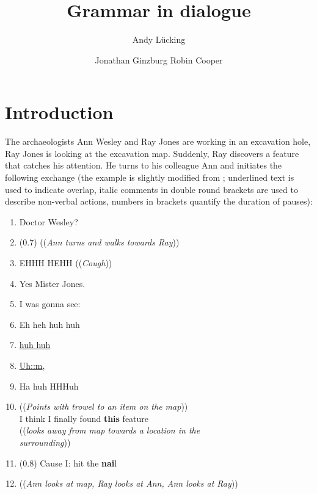 \documentclass[output=paper]{langsci/langscibook}
\author{%
	Andy Lücking\affiliation{Université de Paris, Goethe-Universität Frankfurt}%
	\and Jonathan Ginzburg\affiliation{Université de Paris}%
	\lastand Robin Cooper\affiliation{G\"{o}teborgs Universitet}%
}
\title{Grammar in dialogue}
\begin{document}
\label{chap-pragmatics}

\maketitle

{%
\avmoptions{}

\section{Introduction} 
\label{sec:introduction}

The archaeologists Ann Wesley and Ray Jones are working in an excavation hole, Ray Jones is looking at the excavation map.
%
Suddenly, Ray discovers a feature that catches his attention. %
He turns to his colleague Ann and initiates the following exchange (the example is slightly modified from \citet[]{Goodwin:2003}; underlined text is used to indicate overlap, italic comments in double round brackets are used to describe non-verbal actions, numbers in brackets quantify the duration of pauses):
%
\ea \label{ex:ann-ray}
\begin{enumerate}[noitemsep]
    \item {} Doctor Wesley?
    \item \speaking{} \quad (0.7) ((\textit{Ann turns and walks towards Ray}))
    \item {} EHHH HEHH ((\textit{Cough}))
    \item \speaking{} Yes Mister Jones.
    \item {} I was gonna see:
    \item {} \textdegree Eh heh huh huh
    \item \speaking{}  \underline{huh huh}
    \item {}  \underline{Uh::m},
    \item {} Ha huh HHHuh
    \item {} ((\textit{Points with trowel to an item on the map})) \\ 
    \speaking{} I think I finally found \textbf{this} feature \\
    \speaking{} ((\textit{looks away from map towards a location in the}\\ \speaking{} \textit{surrounding}))
    \item \speaking{} (0.8) Cause I: hit the \textbf{nai}l
    \item ((\textit{Ann looks at map, Ray looks at Ann, Ann looks at Ray}))
\end{enumerate}
\z


}
\end{document}
